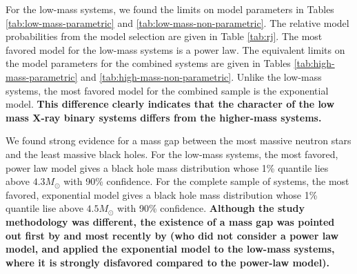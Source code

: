 \documentclass[preprint]{aastex}
\newcommand{\Msun}{M_\odot}
\newcommand{\changed}[1]{{\bf #1 }}
\begin{document}
For the low-mass systems, we found the limits on model parameters in
Tables \ref{tab:low-mass-parametric} and
\ref{tab:low-mass-non-parametric}.  The relative model probabilities
from the model selection are given in Table \ref{tab:rj}.  The most
favored model for the low-mass systems is a power law.  The equivalent
limits on the model parameters for the combined systems are given in
Tables \ref{tab:high-mass-parametric} and
\ref{tab:high-mass-non-parametric}.  Unlike the low-mass systems, the
most favored model for the combined sample is the exponential model.
\changed{This difference clearly indicates that the character of the
  low mass X-ray binary systems differs from the higher-mass systems.}

We found strong evidence for a mass gap between the most massive
neutron stars and the least massive black holes.  For the low-mass
systems, the most favored, power law model gives a black hole mass
distribution whose 1\% quantile lies above $4.3 \Msun$ with 90\%
confidence.  For the complete sample of systems, the most favored,
exponential model gives a black hole mass distribution whose 1\%
quantile lise above $4.5 \Msun$ with 90\% confidence.
\changed{Although the study methodology was different, the existence
  of a mass gap was pointed out first by \citet{Bailyn1998} and most
  recently by \citet{Ozel2010} (who did not consider a power law
  model, and applied the exponential model to the low-mass systems,
  where it is strongly disfavored compared to the power-law model).}
\end{document}
